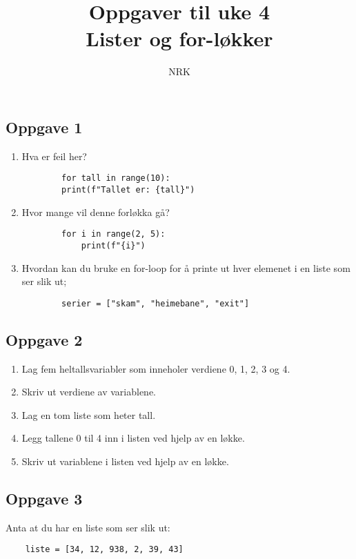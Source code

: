 \documentclass{article}
\title{Oppgaver til uke 4 \\ Lister og for-løkker}
\author{NRK}
\date{}
\begin{document}
\maketitle
\noindent

\subsection*{Oppgave 1}
\begin{enumerate}
    \item Hva er feil her?
    \begin{verbatim}
        for tall in range(10):
        print(f"Tallet er: {tall}")
    \end{verbatim}

    \item Hvor mange vil denne forløkka gå?
    \begin{verbatim}
        for i in range(2, 5):
            print(f"{i}")
    \end{verbatim}
    \item Hvordan kan du bruke en for-loop for å printe ut hver elemenet i en liste som ser slik ut;
    \begin{verbatim}
        serier = ["skam", "heimebane", "exit"]
    \end{verbatim}
\end{enumerate}
\subsection*{Oppgave 2}
\begin{enumerate}
 \item Lag fem heltallsvariabler som inneholer verdiene 0, 1, 2, 3 og 4.
 \item Skriv ut verdiene av variablene.
 \item Lag en tom liste som heter tall.
 \item Legg tallene 0 til 4 inn i listen ved hjelp av en løkke.
 \item Skriv ut variablene i listen ved hjelp av en løkke.
\end{enumerate}


\subsection*{Oppgave 3}
Anta at du har en liste som ser slik ut:

\begin{verbatim}
    liste = [34, 12, 938, 2, 39, 43]
\end{verbatim}
\end{document}
